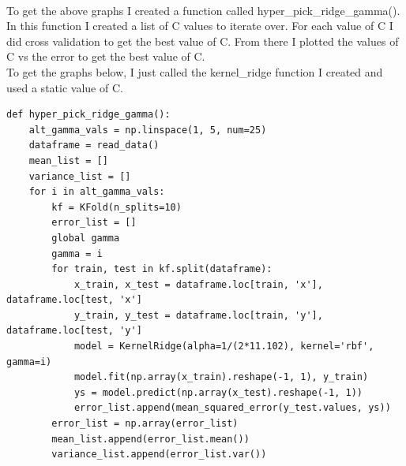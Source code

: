 \documentclass[11pt]{article} %
\begin{document}
\\ To get the above graphs I created a function called hyper\_pick\_ridge\_gamma(). In this function I created a list of C values to iterate over. For each value of C I did cross validation to get the best value of C. From there I plotted the values of C vs the error to get the best value of C. 
\\ To get the graphs below, I just called the kernel\_ridge function I created and used a static value of C.
\begin{verbatim}
def hyper_pick_ridge_gamma():
    alt_gamma_vals = np.linspace(1, 5, num=25)
    dataframe = read_data()
    mean_list = []
    variance_list = []
    for i in alt_gamma_vals:
        kf = KFold(n_splits=10)
        error_list = []
        global gamma
        gamma = i
        for train, test in kf.split(dataframe):
            x_train, x_test = dataframe.loc[train, 'x'], dataframe.loc[test, 'x']
            y_train, y_test = dataframe.loc[train, 'y'], dataframe.loc[test, 'y']
            model = KernelRidge(alpha=1/(2*11.102), kernel='rbf', gamma=i)
            model.fit(np.array(x_train).reshape(-1, 1), y_train)
            ys = model.predict(np.array(x_test).reshape(-1, 1))
            error_list.append(mean_squared_error(y_test.values, ys))
        error_list = np.array(error_list)
        mean_list.append(error_list.mean())
        variance_list.append(error_list.var())
\end{verbatim}		
\end{document}
